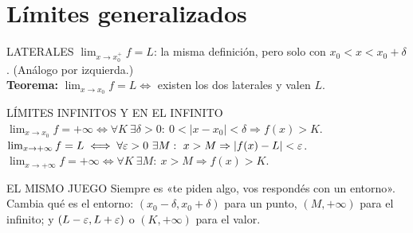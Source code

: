 \section{Límites generalizados}
\agregado
\begin{sello}{LATERALES}
$\lim_{x\to x_0^+}f=L$: la misma definición, pero solo con $x_0<x<x_0+\delta$. (Análogo por izquierda.)\\[2pt]
\textbf{Teorema:} $\lim_{x\to x_0}f=L\iff$ existen los dos laterales y valen $L$.
\end{sello}
\begin{sello}{LÍMITES INFINITOS Y EN EL INFINITO}
$\lim_{x\to x_0}f=+\infty\iff\forall K\ \exists\delta>0:\ 0<|x-x_0|<\delta\Rightarrow f(x)>K$.\\[2pt]
$\lim_{x\to+\infty}f=L\iff\forall\eps>0\ \exists M:\ x>M\Rightarrow|f(x)-L|<\eps$.\\[2pt]
$\lim_{x\to+\infty}f=+\infty\iff\forall K\ \exists M:\ x>M\Rightarrow f(x)>K$.
\end{sello}
\begin{tip}{EL MISMO JUEGO}
Siempre es «te piden algo, vos respondés con un entorno». Cambia qué es el entorno: $(x_0-\delta,x_0+\delta)$ para un punto, $(M,+\infty)$ para el infinito; y $(L-\varepsilon,L+\varepsilon)$ o $(K,+\infty)$ para el valor.
\end{tip}

